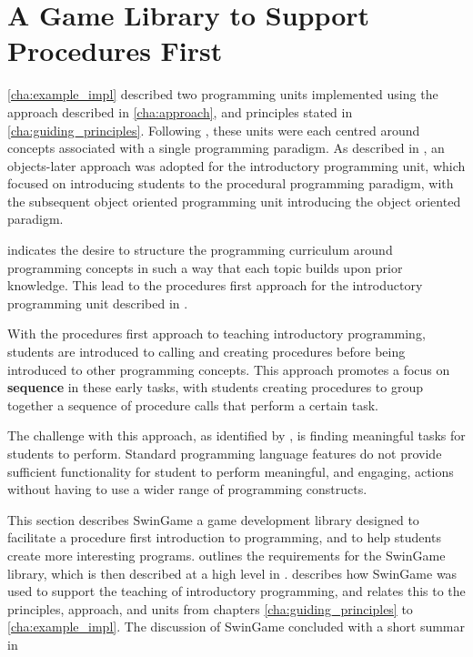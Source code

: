 
\clearpage
\section{A Game Library to Support Procedures First} %
\label{sec:swingame}

\cref{cha:example_impl} described two programming units implemented using the approach described in \cref{cha:approach}, and principles stated in \cref{cha:guiding_principles}. Following , these units were each centred around concepts associated with a single programming paradigm. As described in , an objects-later approach was adopted for the introductory programming unit, which focused on introducing students to the procedural programming paradigm, with the subsequent object oriented programming unit introducing the object oriented paradigm.

 indicates the desire to structure the programming curriculum around programming concepts in such a way that each topic builds upon prior knowledge. This lead to the procedures first approach for the introductory programming unit described in . 

With the procedures first approach to teaching introductory programming, students are introduced to calling and creating procedures before being introduced to other programming concepts. This approach promotes a focus on \textbf{sequence} in these early tasks, with students creating procedures to group together a sequence of procedure calls that perform a certain task. 

The challenge with this approach, as identified by \citet{Pattis:1993}, is finding meaningful tasks for students to perform. Standard programming language features do not provide sufficient functionality for student to perform meaningful, and engaging, actions without having to use a wider range of programming constructs.

This section describes SwinGame \cite{swingame} a game development library designed to facilitate a procedure first introduction to programming, and to help students create more interesting programs.  outlines the requirements for the SwinGame library, which is then described at a high level in .  describes how SwinGame was used to support the teaching of introductory programming, and relates this to the principles, approach, and units from chapters \ref{cha:guiding_principles} to \ref{cha:example_impl}. The discussion of SwinGame concluded with a short summar in 

